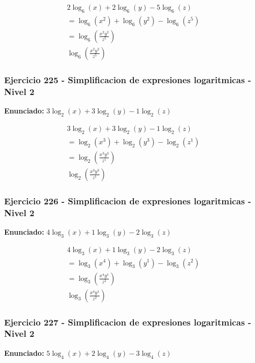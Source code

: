 \documentclass[12pt,a4paper]{article}
\begin{document}
\[
\begin{aligned}
2\log_{6}\left(x\right)+2\log_{6}\left(y\right)-5\log_{6}\left(z\right)\\
=\log_{6}\left(x^{2}\right)+\log_{6}\left(y^{2}\right)-\log_{6}\left(z^{5}\right)\\
=\log_{6}\left(\frac{x^{2}y^{2}}{z^{5}}\right)\\
\boxed{\log_{6}\left(\frac{x^{2}y^{2}}{z^{5}}\right)}
\end{aligned}
\]


\subsubsection*{Ejercicio 225 - Simplificacion de expresiones logaritmicas - Nivel 2}
\textbf{Enunciado:} \(3\log_{2}\left(x\right)+3\log_{2}\left(y\right)-1\log_{2}\left(z\right)\)

\[
\begin{aligned}
3\log_{2}\left(x\right)+3\log_{2}\left(y\right)-1\log_{2}\left(z\right)\\
=\log_{2}\left(x^{3}\right)+\log_{2}\left(y^{3}\right)-\log_{2}\left(z^{1}\right)\\
=\log_{2}\left(\frac{x^{3}y^{3}}{z^{1}}\right)\\
\boxed{\log_{2}\left(\frac{x^{3}y^{3}}{z^{1}}\right)}
\end{aligned}
\]


\subsubsection*{Ejercicio 226 - Simplificacion de expresiones logaritmicas - Nivel 2}
\textbf{Enunciado:} \(4\log_{3}\left(x\right)+1\log_{3}\left(y\right)-2\log_{3}\left(z\right)\)

\[
\begin{aligned}
4\log_{3}\left(x\right)+1\log_{3}\left(y\right)-2\log_{3}\left(z\right)\\
=\log_{3}\left(x^{4}\right)+\log_{3}\left(y^{1}\right)-\log_{3}\left(z^{2}\right)\\
=\log_{3}\left(\frac{x^{4}y^{1}}{z^{2}}\right)\\
\boxed{\log_{3}\left(\frac{x^{4}y^{1}}{z^{2}}\right)}
\end{aligned}
\]


\subsubsection*{Ejercicio 227 - Simplificacion de expresiones logaritmicas - Nivel 2}
\textbf{Enunciado:} \(5\log_{4}\left(x\right)+2\log_{4}\left(y\right)-3\log_{4}\left(z\right)\)
\end{document}
